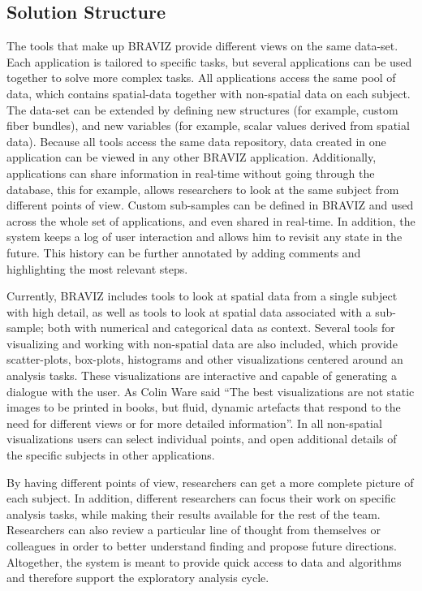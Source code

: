 \documentclass[utf8,paper]{frontiersSCNS} %
\begin{document}
\subsection{Solution Structure}

The tools that make up BRAVIZ provide different views on the same data-set. Each application is tailored to specific tasks, but several applications can be used together to solve more complex tasks. All applications access the same pool of data, which contains spatial-data together with non-spatial data on each subject. The data-set can be extended by defining new structures (for example, custom fiber bundles), and new variables (for example, scalar values derived from spatial data). Because all tools access the same data repository, data created in one application can be viewed in any other BRAVIZ application. Additionally, applications can share information in real-time without going through the database, this for example, allows researchers to look at the same subject from different points of view. Custom sub-samples can be defined in BRAVIZ and used across the whole set of applications, and even shared in real-time. In addition, the system keeps a log of user interaction and allows him to revisit any state in the future. This history can be further annotated by adding comments and highlighting the most relevant steps.

Currently, BRAVIZ includes tools to look at spatial data from a single subject with high detail, as well as tools to look at spatial data associated with a sub-sample; both with numerical and categorical data as context. Several tools for visualizing and working with non-spatial data are also included, which provide scatter-plots, box-plots, histograms and other visualizations centered around an analysis tasks. These visualizations are interactive and capable of generating a dialogue with the user.
As Colin Ware \citep{ware_information_2004} said ``The best visualizations are not static images to be printed in books, but fluid, dynamic artefacts that respond to the need for different views or for more detailed information''. In all non-spatial visualizations users can select individual points, and open additional details of the specific subjects in other applications. 

By having different points of view, researchers can get a more complete picture of each subject. In addition, different researchers can focus their work on specific analysis tasks, while making their results available for the rest of the team. Researchers can also review a particular line of thought from themselves or colleagues in order to better understand finding and propose future directions. Altogether, the system is meant to provide quick access to data and algorithms and therefore support the exploratory analysis cycle. 
\end{document}
